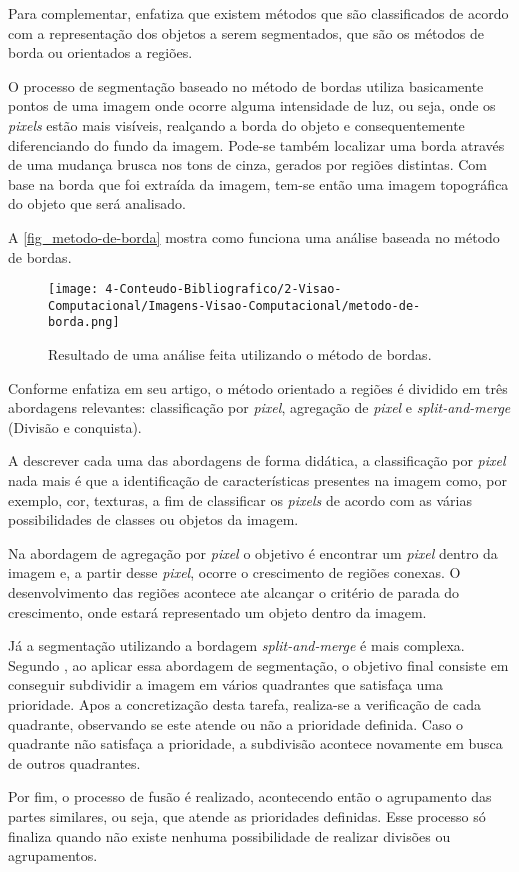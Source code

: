 Para complementar,  enfatiza que existem métodos que são classificados de acordo com a representação dos objetos a serem segmentados, que são os métodos de borda ou orientados a regiões.

O processo de segmentação baseado no método de bordas utiliza basicamente pontos de uma imagem onde ocorre alguma intensidade de luz, ou seja, onde os \textit{pixels} estão mais visíveis, realçando a borda do objeto e consequentemente diferenciando do fundo da imagem. Pode-se também localizar uma borda através de uma mudança brusca nos tons de cinza, gerados por regiões distintas. Com base na borda que foi extraída da imagem, tem-se então uma imagem topográfica do objeto que será analisado.

A \autoref{fig_metodo-de-borda} mostra como funciona uma análise baseada no método de bordas.

\begin{figure}[h]
	\caption{\label{fig_metodo-de-borda}Resultado de uma análise feita utilizando o método de bordas.}
	\begin{center}
		\texttt{[image: 4-Conteudo-Bibliografico/2-Visao-Computacional/Imagens-Visao-Computacional/metodo-de-borda.png]}
	\end{center}
	\centering {}
\end{figure}

Conforme  enfatiza em seu artigo, o método orientado a regiões é dividido em três abordagens relevantes: classificação por \textit{pixel}, agregação de \textit{pixel} e \textit{split-and-merge} (Divisão e conquista).

A descrever cada uma das abordagens de forma didática, a classificação por \textit{pixel} nada mais é que a identificação de características presentes na imagem como, por exemplo, cor, texturas, a fim de classificar os \textit{pixels} de acordo com as várias possibilidades de classes ou objetos da imagem.

Na abordagem de agregação por \textit{pixel} o objetivo é encontrar um \textit{pixel} dentro da imagem e, a partir desse \textit{pixel}, ocorre o crescimento de regiões conexas. O desenvolvimento das regiões acontece ate alcançar o critério de parada do crescimento, onde estará representado um objeto dentro da imagem.

Já a segmentação utilizando a bordagem \textit{split-and-merge} é mais complexa. Segundo , ao aplicar essa abordagem de segmentação, o objetivo final consiste em conseguir subdividir a imagem em vários quadrantes que satisfaça uma prioridade. Apos a concretização desta tarefa, realiza-se a verificação de cada quadrante, observando se este atende ou não a prioridade definida. Caso o quadrante não satisfaça a prioridade, a subdivisão acontece novamente em busca de outros quadrantes.

Por fim, o processo de fusão é realizado, acontecendo então o agrupamento das partes similares, ou seja, que atende as prioridades definidas. Esse processo só finaliza quando não existe nenhuma possibilidade de realizar divisões ou agrupamentos.